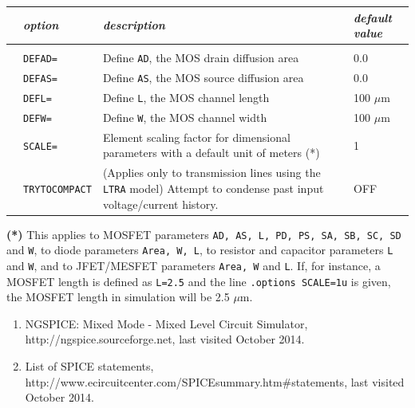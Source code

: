 
\begin{tabular}{p{2cm}|lp{8cm}p{1.5cm}}
&\textit{option} & \textit{description} & \textit{default value}\\ \hline \\ \vspace{-0.8\parskip}
&\texttt{DEFAD=} & Define \texttt{AD}, the MOS drain diffusion area & 0.0 \\
&\texttt{DEFAS=} & Define \texttt{AS}, the MOS source diffusion area & 0.0 \\
&\texttt{DEFL=} & Define \texttt{L}, the MOS channel length & 100 $\mu$m \\
&\texttt{DEFW=} & Define \texttt{W}, the MOS channel width & 100 $\mu$m \\
&\texttt{SCALE=} & Element scaling factor for dimensional parameters with a default unit of meters (*) & 1 \\
&\texttt{TRYTOCOMPACT} & (Applies only to transmission lines using the \texttt{LTRA} model) Attempt to condense past input voltage/current history. & OFF 
\end{tabular}

\textbf{(*)} This applies to MOSFET parameters \texttt{AD, AS, L, PD, PS, SA, SB, SC, SD} and \texttt{W}, to diode parameters \texttt{Area, W, L}, to resistor and capacitor parameters \texttt{L} and \texttt{W}, and to JFET/MESFET parameters \texttt{Area, W} and \texttt{L}.  If, for instance, a MOSFET length is defined as \texttt{L=2.5} and the line \texttt{.options SCALE=1u} is given, the MOSFET length in simulation will be 2.5 $\mu$m.




\begin{enumerate}
\item NGSPICE: Mixed Mode - Mixed Level Circuit Simulator, http://ngspice.sourceforge.net, last visited October 2014.

\item List of SPICE statements, http://www.ecircuitcenter.com/SPICEsummary.htm\#statements, last visited October 2014.

\end{enumerate} 

